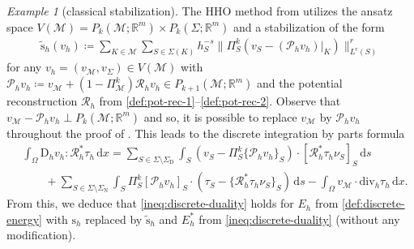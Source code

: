 \documentclass[a4paper]{amsart}
\numberwithin{equation}{section}
\newcommand{\R}{\mathbb{R}}
\renewcommand{\d}[1]{\,\mathrm{d}#1}
\renewcommand{\div}{\mathrm{div}}
\newcommand{\Mcal}{\mathcal{M}}
\newcommand{\D}{\mathrm{D}}
\newcommand{\s}{\mathrm{s}}
\theoremstyle{remark}
\newtheorem{example}[theorem]{Example}
\begin{document}
\begin{example}[classical stabilization]\label{ex:classical-HHO-stab}
	The HHO method from \cite{DiPietroDroniou2017} utilizes the ansatz space $V(\Mcal) = P_k(\Mcal;\R^m) \times P_k(\Sigma;\R^m)$ and a stabilization of the form
	\begin{align}\label{def:classical-HHO-stab}
		\widetilde{\s}_h(v_h) \coloneqq \sum_{K \in \Mcal} \sum_{S \in \Sigma(K)} h_S^{-s} \|\Pi_S^k(v_S - (\mathcal{P}_h v_h)|_K)\|_{L^r(S)}^r
	\end{align}
	for any $v_h = (v_\Mcal, v_\Sigma) \in V(\Mcal)$
	with $\mathcal{P}_h v_h \coloneqq v_\Mcal + (1 - \Pi_\Mcal^k) \mathcal{R}_h v_h \in P_{k+1}(\Mcal;\R^m)$ and the potential reconstruction $\mathcal{R}_h$ from \eqref{def:pot-rec-1}--\eqref{def:pot-rec-2}.
	Observe that $v_\Mcal - \mathcal{P}_h v_h \perp P_k(\Mcal; \R^m)$ and so, it is possible to replace $v_\Mcal$ by $\mathcal{P}_h v_h$ throughout the proof of .
	This leads to the discrete integration by parts formula
	\begin{align*}
		&\int_\Omega \D_h v_h : \mathcal{R}_h^* \tau_h \d{x} = \sum_{S \in \Sigma\setminus\Sigma_\mathrm{D}} \int_S (v_S - \Pi_S^k\{\mathcal{P}_h v_h\}_S) \cdot [\mathcal{R}_h^* \tau_h \nu_S]_S \d{s}\nonumber\\
		&\qquad+ \sum_{S \in \Sigma\setminus\Sigma_\mathrm{N}} \int_S \Pi_S^k[\mathcal{P}_h v_h]_S \cdot (\tau_S - \{\mathcal{R}_h^* \tau_h \nu_S\}_S) \d{s} - \int_\Omega v_\Mcal \cdot \div_h \tau_h \d{x}.
	\end{align*}
	From this, we deduce that \eqref{ineq:discrete-duality} holds for $E_h$ from \eqref{def:discrete-energy} with $\s_h$ replaced by $\widetilde{\s}_h$ and $E_h^*$ from \eqref{ineq:discrete-duality} (without any modification).
\end{example}
%
\end{document}
